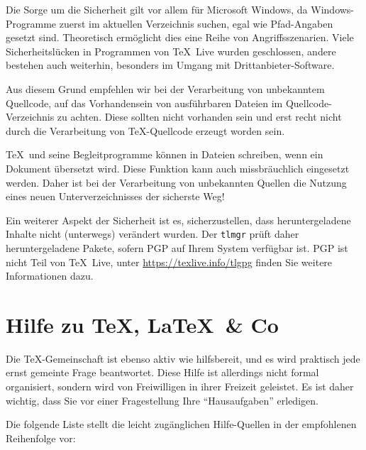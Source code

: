 \documentclass[12pt,ngerman,a4paper,fullparskip]{report}
\newcommand{\TL}{\TeX\ Live\xspace}
\newcommand{\prog}[1]{\texttt{#1}}
\begin{document}
Die Sorge um die Sicherheit gilt vor allem für Microsoft Windows, da Windows-Programme zuerst im aktuellen Verzeichnis suchen, egal wie Pfad-Angaben gesetzt sind. Theoretisch ermöglicht dies eine Reihe von Angriffsszenarien. Viele Sicherheitslücken in Programmen von \TL wurden geschlossen, andere bestehen auch weiterhin, besonders im Umgang mit Drittanbieter-Software. 

Aus diesem Grund empfehlen wir bei der Verarbeitung von unbekanntem Quellcode, auf das Vorhandensein von ausführbaren Dateien im Quellcode-Verzeichnis zu achten. Diese sollten nicht vorhanden sein und erst recht nicht durch die Verarbeitung von \TeX-Quellcode erzeugt worden sein. 

\TeX\ und seine Begleitprogramme können in Dateien schreiben, wenn ein Dokument übersetzt wird. Diese Funktion kann auch missbräuchlich eingesetzt werden. Daher ist bei der Verarbeitung von unbekannten Quellen die Nutzung eines neuen Unterverzeichnisses der sicherste Weg!

Ein weiterer Aspekt der Sicherheit ist es, sicherzustellen, dass heruntergeladene Inhalte nicht (unterwegs) verändert wurden. Der \prog{tlmgr} prüft daher heruntergeladene Pakete, sofern PGP auf Ihrem System verfügbar ist. PGP ist nicht Teil von \TL,  unter \url{https://texlive.info/tlgpg} finden Sie weitere Informationen dazu.

\section{Hilfe zu \TeX, \LaTeX\ \& Co}\label{sec:help}

Die \TeX-Gemeinschaft ist ebenso aktiv wie hilfsbereit, und es wird
praktisch jede ernst gemeinte Frage beantwortet. Diese Hilfe ist allerdings
nicht formal organisiert, sondern wird von Freiwilligen in ihrer
Freizeit geleistet. Es ist daher wichtig, dass Sie vor einer
Fragestellung Ihre \enquote{Hausaufgaben}  erledigen. 


Die folgende Liste stellt die leicht zugänglichen Hilfe-Quellen in der
empfohlenen Reihenfolge vor:
\end{document}
